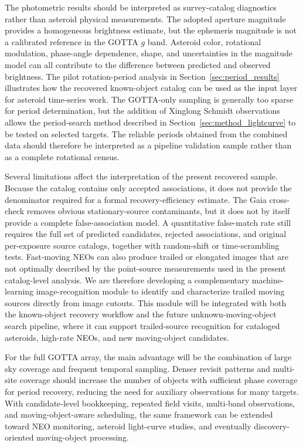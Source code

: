 \documentclass[referee]{raa}
\begin{document}
The photometric results should be interpreted as survey-catalog diagnostics rather than asteroid physical measurements. The adopted aperture magnitude provides a homogeneous brightness estimate, but the ephemeris magnitude is not a calibrated reference in the GOTTA $g$ band. Asteroid color, rotational modulation, phase-angle dependence, shape, and uncertainties in the magnitude model can all contribute to the difference between predicted and observed brightness. The pilot rotation-period analysis in Section~\ref{sec:period_results} illustrates how the recovered known-object catalog can be used as the input layer for asteroid time-series work. The GOTTA-only sampling is generally too sparse for period determination, but the addition of Xinglong Schmidt observations allows the period-search method described in Section~\ref{sec:method_lightcurve} to be tested on selected targets. The reliable periods obtained from the combined data should therefore be interpreted as a pipeline validation sample rather than as a complete rotational census.

Several limitations affect the interpretation of the present recovered sample. Because the catalog contains only accepted associations, it does not provide the denominator required for a formal recovery-efficiency estimate. The Gaia cross-check removes obvious stationary-source contaminants, but it does not by itself provide a complete false-association model. A quantitative false-match rate still requires the full set of predicted candidates, rejected associations, and original per-exposure source catalogs, together with random-shift or time-scrambling tests. Fast-moving NEOs can also produce trailed or elongated images that are not optimally described by the point-source measurements used in the present catalog-level analysis. We are therefore developing a complementary machine-learning image-recognition module to identify and characterize trailed moving sources directly from image cutouts. This module will be integrated with both the known-object recovery workflow and the future unknown-moving-object search pipeline, where it can support trailed-source recognition for cataloged asteroids, high-rate NEOs, and new moving-object candidates.

For the full GOTTA array, the main advantage will be the combination of large sky coverage and frequent temporal sampling. Denser revisit patterns and multi-site coverage should increase the number of objects with sufficient phase coverage for period recovery, reducing the need for auxiliary observations for many targets. With candidate-level bookkeeping, repeated field visits, multi-band observations, and moving-object-aware scheduling, the same framework can be extended toward NEO monitoring, asteroid light-curve studies, and eventually discovery-oriented moving-object processing.
\end{document}
